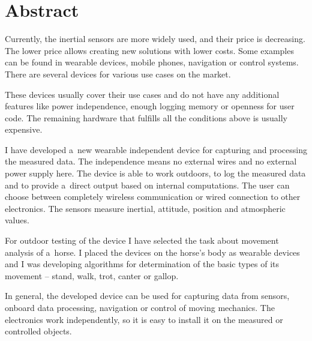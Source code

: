 
\chapter{Abstract}
Currently, the inertial sensors are more widely used, and their price is decreasing. The lower price allows creating new solutions with lower costs. Some examples can be found in wearable devices, mobile phones, navigation or control systems. There are several devices for various use cases on the market.

These devices usually cover their use cases and do not have any additional features like power independence, enough logging memory or openness for user code. The remaining hardware that fulfills all the conditions above is usually expensive.

I have developed a~new wearable independent device for capturing and processing the measured data. The independence means no external wires and no external power supply here. The device is able to work outdoors, to log the measured data and to provide a~direct output based on internal computations. The user can choose between completely wireless communication or wired connection to other electronics. The sensors measure inertial, attitude, position and atmospheric values.

For outdoor testing of the device I have selected the task about movement analysis of a~horse. I placed the devices on the horse's body as wearable devices and I was developing algorithms for determination of the basic types of its movement -- stand, walk, trot, canter or gallop.

In general, the developed device can be used for capturing data from sensors, onboard data processing, navigation or control of moving mechanics. The electronics work independently, so it is easy to install it on the measured or controlled objects.
